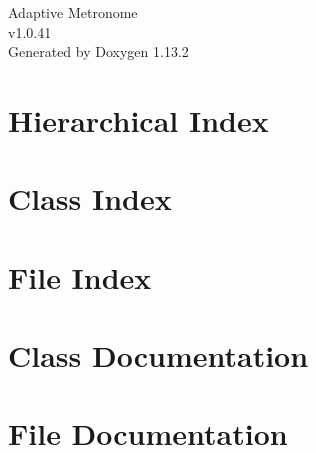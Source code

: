 \documentclass[twoside]{book}
\newcommand{\+}{\discretionary{\mbox{\scriptsize$\hookleftarrow$}}{}{}}
\newcommand{\clearemptydoublepage}{%
    \newpage{\pagestyle{empty}\cleardoublepage}%
  }
\begin{document}
  \raggedbottom
    \hypersetup{pageanchor=false,
                bookmarksnumbered=true,
                pdfencoding=unicode
               }
  \begin{titlepage}
  \vspace*{7cm}
  \begin{center}%
  {\Large Adaptive Metronome}\\
  [1ex]\large v1.\+0.\+41 \\
  \vspace*{1cm}
  {\large Generated by Doxygen 1.13.2}\\
  \end{center}
  \end{titlepage}
  \clearemptydoublepage
  \tableofcontents
  \clearemptydoublepage
  \hypersetup{pageanchor=true}
\chapter{Hierarchical Index}

\chapter{Class Index}

\chapter{File Index}

\chapter{Class Documentation}












\chapter{File Documentation}






  \backmatter
  \newpage
  \clearemptydoublepage
  \printindex
\end{document}
